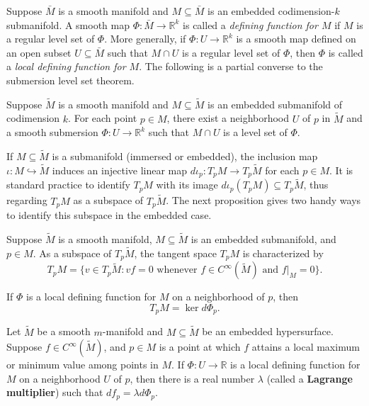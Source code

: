 Suppose $\bar{M}$ is a smooth manifold and $M \subseteq \bar{M}$ is an embedded codimension-$k$ submanifold. A smooth map $\Phi: \bar{M} \to \mathbb{R}^k$ is called a \emph{defining function for $M$} if $M$ is a regular level set of $\Phi$. More generally, if $\Phi: U \to \mathbb{R}^k$ is a smooth map defined on an open subset $U \subseteq \bar{M}$ such that $M \cap U$ is a regular level set of $\Phi$, then $\Phi$ is called a \emph{local defining function for $M$}. The following is a partial converse to the submersion level set theorem.

\begin{proposition}
\label{prop:existence-local-defining-functions}
Suppose $\tilde{M}$ is a smooth manifold and $M \subseteq \tilde{M}$ is an embedded submanifold of codimension $k$. For each point $p \in M$, there exist a neighborhood $U$ of $p$ in $\tilde{M}$ and a smooth submersion $\Phi: U \to \mathbb{R}^k$ such that $M \cap U$ is a level set of $\Phi$.
\end{proposition}

If $M \subseteq \tilde{M}$ is a submanifold (immersed or embedded), the inclusion map $\iota: M \hookrightarrow \tilde{M}$ induces an injective linear map $d\iota_p : T_p M \to T_p \tilde{M}$ for each $p \in M$. It is standard practice to identify $T_p M$ with its image $d\iota_p(T_p M) \subseteq T_p \tilde{M}$, thus regarding $T_p M$ as a subspace of $T_p \tilde{M}$. The next proposition gives two handy ways to identify this subspace in the embedded case.

\begin{proposition}
\label{prop:tangent-space-submanifold}
Suppose $\tilde{M}$ is a smooth manifold, $M \subseteq \tilde{M}$ is an embedded submanifold, and $p \in M$. As a subspace of $T_p \tilde{M}$, the tangent space $T_p M$ is characterized by
\[
T_p M = \{v \in T_p \tilde{M} : vf = 0 \text{ whenever } f \in C^\infty(\tilde{M}) \text{ and } f|_M = 0\}.
\]

If $\Phi$ is a local defining function for $M$ on a neighborhood of $p$, then
\[
T_p M = \ker d\Phi_p.
\]
\end{proposition}

\begin{proposition}
\label{prop:lagrange-multiplier-rule}
Let $\tilde{M}$ be a smooth $m$-manifold and $M \subseteq \tilde{M}$ be an embedded hypersurface. Suppose $f \in C^\infty(\tilde{M})$, and $p \in M$ is a point at which $f$ attains a local maximum or minimum value among points in $M$. If $\Phi: U \to \mathbb{R}$ is a local defining function for $M$ on a neighborhood $U$ of $p$, then there is a real number $\lambda$ (called a \textbf{Lagrange multiplier}) such that $df_p = \lambda d\Phi_p$.
\end{proposition}

